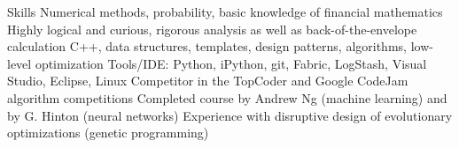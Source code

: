 \begin{rubric}{Skills}
\entry*[]%
Numerical methods, probability, basic knowledge of financial mathematics
\entry*[]%
Highly logical and curious, rigorous analysis as well as back-of-the-envelope calculation
%
%
\entry*[]%
C++, data structures, templates, design patterns, algorithms, low-level optimization 
\entry*[]%
Tools/IDE: Python, iPython, git, Fabric, LogStash, Visual Studio, Eclipse, Linux
\entry*[]%
Competitor in the TopCoder and Google CodeJam algorithm competitions
%
%
\entry*[]%
Completed course by Andrew Ng (machine learning) and by G. Hinton (neural networks)
\entry*[]%
Experience with disruptive design of evolutionary optimizations (genetic programming)
%
%
\end{rubric}
